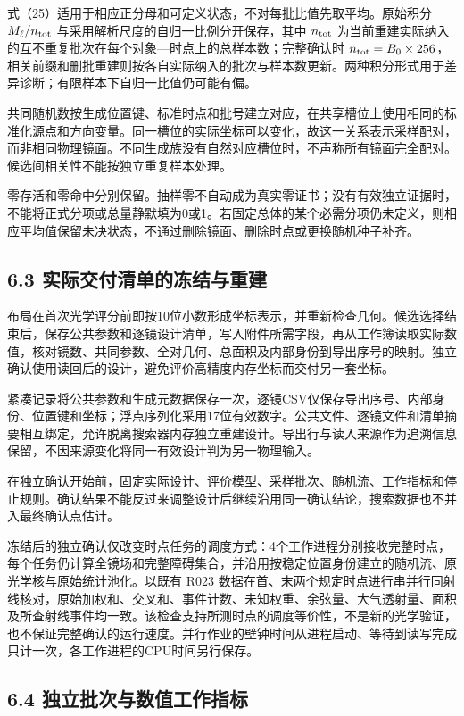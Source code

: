 \documentclass[UTF8,fontset=windows,zihao=-4]{ctexart}
\begin{document}
式（25）适用于相应正分母和可定义状态，不对每批比值先取平均。原始积分 \(M_\ell/n_{\rm tot}\) 与采用解析尺度的自归一比例分开保存，其中 \(n_{\rm tot}\) 为当前重建实际纳入的互不重复批次在每个对象—时点上的总样本数；完整确认时 \(n_{\rm tot}=B_0\times256\)，相关前缀和删批重建则按各自实际纳入的批次与样本数更新。两种积分形式用于差异诊断；有限样本下自归一比值仍可能有偏。

共同随机数按生成位置键、标准时点和批号建立对应，在共享槽位上使用相同的标准化源点和方向变量。同一槽位的实际坐标可以变化，故这一关系表示采样配对，而非相同物理镜面。不同生成族没有自然对应槽位时，不声称所有镜面完全配对。候选间相关性不能按独立重复样本处理。

零存活和零命中分别保留。抽样零不自动成为真实零证书；没有有效独立证据时，不能将正式分项或总量静默填为0或1。若固定总体的某个必需分项仍未定义，则相应平均值保留未决状态，不通过删除镜面、删除时点或更换随机种子补齐。

\subsection*{6.3 实际交付清单的冻结与重建}

布局在首次光学评分前即按10位小数形成坐标表示，并重新检查几何。候选选择结束后，保存公共参数和逐镜设计清单，写入附件所需字段，再从工作簿读取实际数值，核对镜数、共同参数、全对几何、总面积及内部身份到导出序号的映射。独立确认使用读回后的设计，避免评价高精度内存坐标而交付另一套坐标。

紧凑记录将公共参数和生成元数据保存一次，逐镜CSV仅保存导出序号、内部身份、位置键和坐标；浮点序列化采用17位有效数字。公共文件、逐镜文件和清单摘要相互绑定，允许脱离搜索器内存独立重建设计。导出行与读入来源作为追溯信息保留，不因来源变化将同一有效设计判为另一物理输入。

在独立确认开始前，固定实际设计、评价模型、采样批次、随机流、工作指标和停止规则。确认结果不能反过来调整设计后继续沿用同一确认结论，搜索数据也不并入最终确认点估计。

冻结后的独立确认仅改变时点任务的调度方式：4个工作进程分别接收完整时点，每个任务仍计算全镜场和完整障碍集合，并沿用按稳定位置身份建立的随机流、原光学核与原始统计池化。以既有 R023 数据在首、末两个规定时点进行串并行同射线核对，原始加权和、交叉和、事件计数、未知权重、余弦量、大气透射量、面积及所查射线事件均一致。该检查支持所测时点的调度等价性，不是新的光学验证，也不保证完整确认的运行速度。并行作业的壁钟时间从进程启动、等待到读写完成只计一次，各工作进程的CPU时间另行保存。

\subsection*{6.4 独立批次与数值工作指标}
\end{document}
